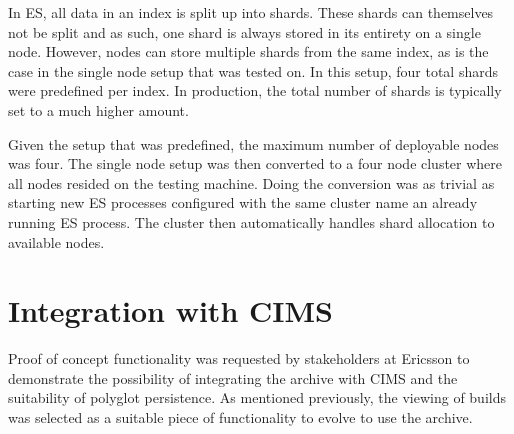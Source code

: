 In ES, all data in an index is split up into shards. These shards can themselves not be split and as such, one shard is always stored in its entirety on a single node. However, nodes can store multiple shards from the same index, as is the case in the single node setup that was tested on. In this setup, four total shards were predefined per index. In production, the total number of shards is typically set to a much higher amount. 

Given the setup that was predefined, the maximum number of deployable nodes was four. The single node setup was then converted to a four node cluster where all nodes resided on the testing machine. Doing the conversion was as trivial as starting new ES processes configured with the same cluster name an already running ES process. The cluster then automatically handles shard allocation to available nodes.

%
%

\section{Integration with CIMS}
Proof of concept functionality was requested by stakeholders at Ericsson to demonstrate the possibility of integrating the archive with CIMS and the suitability of polyglot persistence. As mentioned previously, the viewing of builds was selected as a suitable piece of functionality to evolve to use the archive. 

